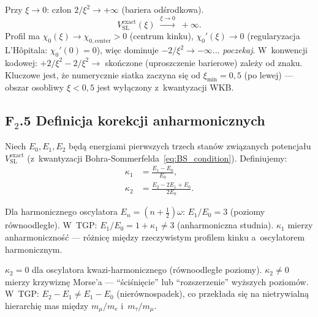 \begin{propozycja}[Granica $\xi\to 0$]
Przy $\xi \to 0$: człon $2/\xi^2 \to +\infty$ (bariera odśrodkowa).
\begin{equation}
  V_\mathrm{SL}^\mathrm{exact}(\xi) \;\xrightarrow{\xi\to 0}\; +\infty.
\end{equation}
Profil ma $\chi_0(\xi) \to \chi_{0,\mathrm{center}} > 0$ (centrum kinku),
$\chi_0'(\xi) \to 0$ (regularyzacja L'Hôpitala: $\chi_0'(0) = 0$),
więc dominuje $-2/\xi^2 \to -\infty$... \emph{poczekaj}.
W~konwencji kodowej: $+2/\xi^2 - 2/\xi^2 \to$ skończone (uproszczenie barierowe)
zależy od znaku. Kluczowe jest, że numerycznie siatka zaczyna się
od $\xi_\mathrm{min} = 0{,}5$ (po lewej) — obszar osobliwy
$\xi < 0{,}5$ jest wyłączony z~kwantyzacji WKB.
\end{propozycja}

\subsection*{F$_2$.5 Definicja korekcji anharmonicznych}

\begin{definicja}
\label{def:kappa_corrections}
Niech $E_0, E_1, E_2$ będą energiami pierwszych trzech stanów
związanych potencjału $V_\mathrm{SL}^\mathrm{exact}$
(z~kwantyzacji Bohra-Sommerfelda~\eqref{eq:BS_condition}).
Definiujemy:
\begin{align}
  \kappa_1
  &= \frac{E_1 - E_0}{E_0},
  \label{eq:kappa1_def}\\
  \kappa_2
  &= \frac{E_2 - 2E_1 + E_0}{2E_0}.
  \label{eq:kappa2_def}
\end{align}
\end{definicja}

\begin{uwaga}
Dla harmonicznego oscylatora $E_n = (n+\frac{1}{2})\omega$:
$E_1/E_0 = 3$ (poziomy równoodległe). W~TGP:
$E_1/E_0 = 1 + \kappa_1 \neq 3$ (anharmoniczna studnia).
$\kappa_1$ mierzy anharmoniczność --- różnicę między rzeczywistym
profilem kinku a~oscylatorem harmonicznym.
\end{uwaga}

\begin{uwaga}
$\kappa_2 = 0$ dla oscylatora kwazi-harmonicznego (równoodległe poziomy).
$\kappa_2 \neq 0$ mierzy krzywiznę Morse'a --- ``ściśnięcie''
lub ``rozszerzenie'' wyższych poziomów. W~TGP:
$E_2 - E_1 \neq E_1 - E_0$ (nierównospadek), co przekłada się
na nietrywialną hierarchię mas między $m_\mu/m_e$ i~$m_\tau/m_\mu$.
\end{uwaga}

